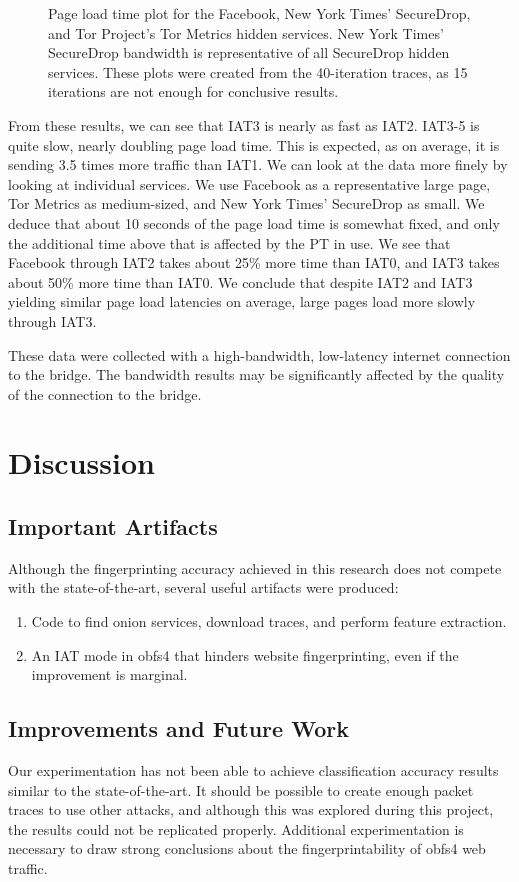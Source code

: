\documentclass[11pt]{article}
\begin{document}
\begin{figure}[tb]
    \caption[]{Page load time plot for the Facebook, New York Times' SecureDrop, and Tor Project's Tor Metrics hidden services. New York Times' SecureDrop bandwidth is representative of all SecureDrop hidden services. These plots were created from the 40-iteration traces, as 15 iterations are not enough for conclusive results.}
\end{figure}

From these results, we can see that IAT3 is nearly as fast as IAT2. IAT3-5 is quite slow, nearly doubling page load time. This is expected, as on average, it is sending 3.5 times more traffic than IAT1. We can look at the data more finely by looking at individual services. We use Facebook as a representative large page, Tor Metrics as medium-sized, and New York Times' SecureDrop as small. We deduce that about 10 seconds of the page load time is somewhat fixed, and only the additional time above that is affected by the PT in use. We see that Facebook through IAT2 takes about 25\% more time than IAT0, and IAT3 takes about 50\% more time than IAT0. We conclude that despite IAT2 and IAT3 yielding similar page load latencies on average, large pages load more slowly through IAT3.

These data were collected with a high-bandwidth, low-latency internet connection to the bridge. The bandwidth results may be significantly affected by the quality of the connection to the bridge.

\section{Discussion}
\subsection{Important Artifacts}
Although the fingerprinting accuracy achieved in this research does not compete with the state-of-the-art, several useful artifacts were produced:
\begin{enumerate}
    \item Code to find onion services, download traces, and perform feature extraction.
    \item An IAT mode in obfs4 that hinders website fingerprinting, even if the improvement is marginal.
\end{enumerate}
\subsection{Improvements and Future Work}
Our experimentation has not been able to achieve classification accuracy results similar to the state-of-the-art. It should be possible to create enough packet traces to use other attacks, and although this was explored during this project, the results could not be replicated properly. Additional experimentation is necessary to draw strong conclusions about the fingerprintability of obfs4 web traffic.
\end{document}
